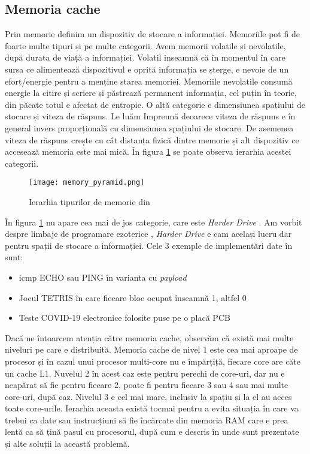 \documentclass[../main.tex]{subfiles}
\begin{document}
\subsection{Memoria cache}
Prin memorie definim un dispozitiv de stocare a informației. Memoriile pot fi de foarte multe tipuri și pe multe categorii.
Avem memorii volatile și nevolatile, după durata de viață a informației. Volatil inseamnă că în momentul în care sursa
ce alimentează dispozitivul e oprită informația se șterge, e nevoie de un efort/energie pentru a menține starea memoriei.
Memoriile nevolatile consumă energie la citire și scriere și păstrează permanent informația, cel puțin în teorie, din păcate
totul e afectat de entropie. O altă categorie e dimensiunea spațiului de stocare și viteza de răspuns. Le luăm Impreună
deoarece viteza de răspuns e în general invers proporțională cu dimensiunea spațiului de stocare. De asemenea viteza de
răspuns crește cu cât distanța fizică dintre memorie și alt dispozitiv ce accesează memoria este mai mică. În figura
\ref{fig:memory_pyramid} se poate observa ierarhia acestei categorii.

\begin{figure}[h]
    \centering
    \texttt{[image: memory\_pyramid.png]}
    \caption{Ierarhia tipurilor de memorie din \cite{memoryhierarchy}}
    \label{fig:memory_pyramid}
\end{figure}

În figura \ref{fig:memory_pyramid} nu apare cea mai de jos categorie, care este \emph{Harder Drive} \cite{harderdrive}. 
Am vorbit despre limbaje de programare ezoterice \cite{esolangs}, \emph{Harder Drive} \cite{harderdrive} e cam același 
lucru dar pentru spații de stocare a informației. Cele 3 exemple de implementări date în \cite{harderdrive} sunt:
\begin{itemize}
    \item \acrshort{icmp} ECHO sau PING în varianta cu \emph{payload}
    \item Jocul TETRIS în care fiecare bloc ocupat înseamnă 1, altfel 0
    \item Teste COVID-19 electronice folosite puse pe o placă PCB
\end{itemize}

Dacă ne întoarcem atenția către memoria cache, observăm că există mai multe niveluri pe care e distribuită. Memoria cache
de nivel 1 este cea mai aproape de procesor și în cazul unui procesor multi-core nu e împărțiță, fiecare core are căte un
cache L1. Nuvelul 2 în acest caz este pentru perechi de core-uri, dar nu e neapărat să fie pentru fiecare 2, poate fi pentru
fiecare 3 sau 4 sau mai multe core-uri, după caz. Nivelul 3 e cel mai mare, inclusiv la spațiu și la el au acces toate
core-urile. Ierarhia aceasta există tocmai pentru a evita situația în care va trebui ca date sau instrucțiuni să fie încărcate
din memoria RAM care e prea lentă ca să țină pasul cu procesorul, după cum e descris în \cite{bottleneck} unde sunt prezentate 
și alte soluții la această problemă.
\end{document}
